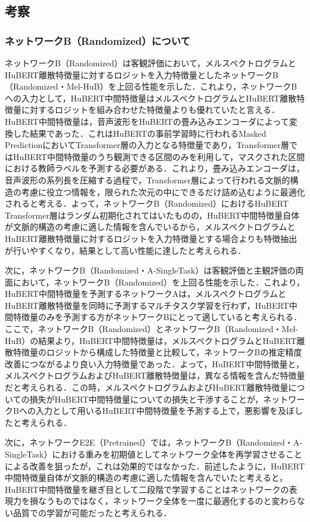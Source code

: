 \subsection{考察}
\subsubsection{ネットワークB（Randomized）について}
\label{sec4:sec:consideration_b_randomized}
ネットワークB（Randomized）は客観評価において，メルスペクトログラムとHuBERT離散特徴量に対するロジットを入力特徴量としたネットワークB（Randomized・Mel-HuB）を上回る性能を示した．これより，ネットワークBへの入力として，HuBERT中間特徴量はメルスペクトログラムとHuBERT離散特徴量に対するロジットを組み合わせた特徴量よりも優れていたと言える．HuBERT中間特徴量は，音声波形をHuBERTの畳み込みエンコーダによって変換した結果であった．これはHuBERTの事前学習時に行われるMasked PredictionにおいてTransformer層の入力となる特徴量であり，Transformer層ではHuBERT中間特徴量のうち観測できる区間のみを利用して，マスクされた区間における教師ラベルを予測する必要がある．これより，畳み込みエンコーダは，音声波形の系列長を圧縮する過程で，Transformer層によって行われる文脈的構造の考慮に役立つ情報を，限られた次元の中にできるだけ詰め込むように最適化されると考える．よって，ネットワークB（Randomized）におけるHuBERT Transformer層はランダム初期化されてはいたものの，HuBERT中間特徴量自体が文脈的構造の考慮に適した情報を含んでいるから，メルスペクトログラムとHuBERT離散特徴量に対するロジットを入力特徴量とする場合よりも特徴抽出が行いやすくなり，結果として高い性能に達したと考えられる．

次に，ネットワークB（Randomized・A-SingleTask）は客観評価と主観評価の両面において，ネットワークB（Randomized）を上回る性能を示した．これより，HuBERT中間特徴量を予測するネットワークAは，メルスペクトログラムとHuBERT離散特徴量を同時に予測するマルチタスク学習を行わず，HuBERT中間特徴量のみを予測する方がネットワークBにとって適していると考えられる．ここで，ネットワークB（Randomized）とネットワークB（Randomized・Mel-HuB）の結果より，HuBERT中間特徴量は，メルスペクトログラムとHuBERT離散特徴量のロジットから構成した特徴量と比較して，ネットワークBの推定精度改善につながるより良い入力特徴量であった．よって，HuBERT中間特徴量と，メルスペクトログラムおよびHuBERT離散特徴量は，異なる情報を含んだ特徴量だと考えられる．この時，メルスペクトログラムおよびHuBERT離散特徴量についての損失がHuBERT中間特徴量についての損失と干渉することが，ネットワークBへの入力として用いるHuBERT中間特徴量を予測する上で，悪影響を及ぼしたと考えられる．

次に，ネットワークE2E（Pretrained）では，ネットワークB（Randomized・A-SingleTask）における重みを初期値としてネットワーク全体を再学習させることによる改善を狙ったが，これは効果的ではなかった．前述したように，HuBERT中間特徴量自体が文脈的構造の考慮に適した情報を含んでいたと考えると，HuBERT中間特徴量を継ぎ目として二段階で学習することはネットワークの表現力を損なうものではなく，ネットワーク全体を一度に最適化するのと変わらない品質での学習が可能だったと考えられる．

